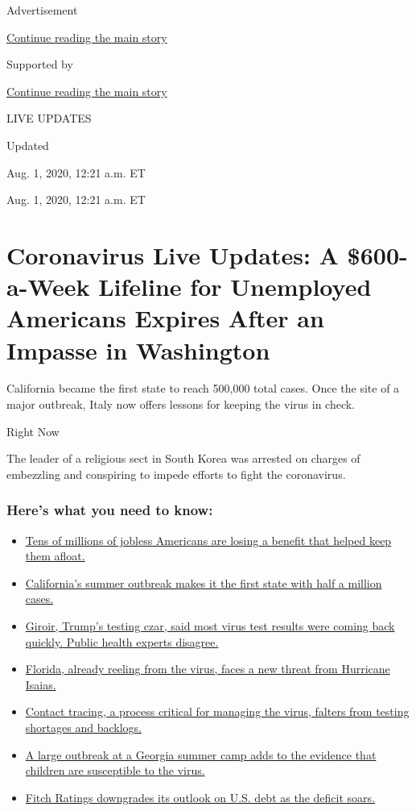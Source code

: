 Advertisement

\protect\hyperlink{after-top}{Continue reading the main story}

Supported by

\protect\hyperlink{after-sponsor}{Continue reading the main story}

LIVE UPDATES

Updated~

Aug. 1, 2020, 12:21 a.m. ET

Aug. 1, 2020, 12:21 a.m. ET

\hypertarget{coronavirus-live-updates-a-600-a-week-lifeline-for-unemployed-americans-expires-after-an-impasse-in-washington}{%
\section{Coronavirus Live Updates: A \$600-a-Week Lifeline for
Unemployed Americans Expires After an Impasse in
Washington}\label{coronavirus-live-updates-a-600-a-week-lifeline-for-unemployed-americans-expires-after-an-impasse-in-washington}}

California became the first state to reach 500,000 total cases. Once the
site of a major outbreak, Italy now offers lessons for keeping the virus
in check.

Right Now

The leader of a religious sect in South Korea was arrested on charges of
embezzling and conspiring to impede efforts to fight the coronavirus.

\hypertarget{heres-what-you-need-to-know}{%
\subsubsection{Here's what you need to
know:}\label{heres-what-you-need-to-know}}

\begin{itemize}
\tightlist
\item
  \protect\hyperlink{link-7c4d159d}{Tens of millions of jobless
  Americans are losing a benefit that helped keep them afloat.}
\item
  \protect\hyperlink{link-4e17d805}{California's summer outbreak makes
  it the first state with half a million cases.}
\item
  \protect\hyperlink{link-65fa7f74}{Giroir, Trump's testing czar, said
  most virus test results were coming back quickly. Public health
  experts disagree.}
\item
  \protect\hyperlink{link-3bb771a7}{Florida, already reeling from the
  virus, faces a new threat from Hurricane Isaias.}
\item
  \protect\hyperlink{link-747b61fb}{Contact tracing, a process critical
  for managing the virus, falters from testing shortages and backlogs.}
\item
  \protect\hyperlink{link-19b57b6f}{A large outbreak at a Georgia summer
  camp adds to the evidence that children are susceptible to the virus.}
\item
  \protect\hyperlink{link-7f02e642}{Fitch Ratings downgrades its outlook
  on U.S. debt as the deficit soars.}
\end{itemize}

